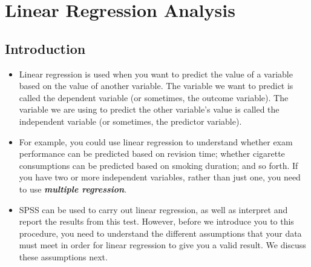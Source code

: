 \documentclass[a4paper,12pt]{article}
\begin{document}
	
	\tableofcontents
	\newpage
	
	
	
	
\section{Linear Regression Analysis}

\subsection{Introduction}
\begin{itemize}
\item Linear regression is used when you want to predict the value of a variable based on the value of another variable. The variable we want to predict is called the dependent variable (or sometimes, the outcome variable). The variable we are using to predict the other variable's value is called the independent variable (or sometimes, the predictor variable).


\item For example, you could use linear regression to understand whether exam performance can be predicted based on revision time; whether cigarette consumptions can be predicted based on smoking duration; and so forth. If you have two or more independent variables, rather than just one, you need to use \textbf{\textit{multiple regression}}.

\item SPSS can be used to carry out linear regression, as well as interpret and report the results from this test. However, before we introduce you to this procedure, you need to understand the different assumptions that your data must meet in order for linear regression to give you a valid result. We discuss these assumptions next.

\end{itemize}
\end{document}
